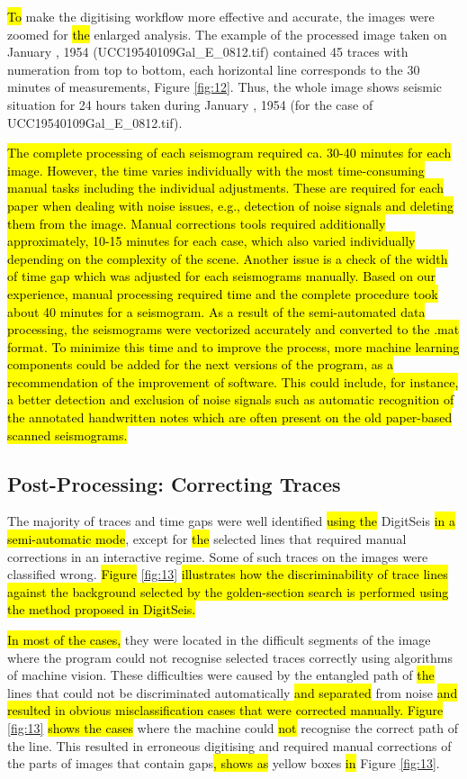 \documentclass[sensors,article,submit,moreauthors,pdftex]{Definitions/mdpi}
\begin{document}
\hl{To }make the digitising workflow more effective and accurate, the images were zoomed for \hl{the }enlarged analysis. The example of the processed image taken on January , 1954 (UCC19540109Gal\_E\_0812.tif) contained 45 traces with numeration from top to bottom, each horizontal line corresponds to the 30 minutes of measurements, Figure \ref{fig:12}. Thus, the whole image shows seismic situation for 24 hours taken during January , 1954 (for the case of UCC19540109Gal\_E\_0812.tif).

\hl{The complete processing of each seismogram required ca. 30-40 minutes for each image. However, the time varies individually with the most time-consuming manual tasks including the individual adjustments. These are required for each paper when dealing with noise issues, e.g., detection of noise signals and deleting them from the image. Manual corrections tools required additionally approximately, 10-15 minutes for each case, which also varied individually depending on the complexity of the scene. Another issue is a check of the width of time gap which was adjusted for each seismograms manually. Based on our experience, manual processing required time and the complete procedure took about 40 minutes for a seismogram. As a result of the semi-automated data processing, the seismograms were vectorized accurately and converted to the .mat format. To minimize this time and to improve the process, more machine learning components could be added for the next versions of the program, as a recommendation of the improvement of software. This could include, for instance, a better detection and exclusion of noise signals such as automatic recognition of the annotated handwritten notes which are often present on the old paper-based scanned seismograms.}

\subsection{Post-Processing: Correcting Traces}

The majority of traces and time gaps were well identified \hl{using the }DigitSeis \hl{in a semi-automatic mode}, except for \hl{the }selected lines that required manual corrections in an interactive regime. Some of such traces on the images were classified wrong.\hl{ Figure} \ref{fig:13} \hl{illustrates how the discriminability of trace lines against the background selected by the golden-section search is performed using the method proposed in DigitSeis.}

\hl{In most of the cases,} they were located in the difficult segments of the image where the program could not recognise selected traces correctly using algorithms of machine vision. These difficulties were caused by the entangled path of\hl{ the }lines that could not be discriminated automatically \hl{and separated }from noise \hl{and resulted in obvious misclassification cases that were corrected manually. Figure } \ref{fig:13} \hl{shows the cases }where the machine could \hl{not }recognise the correct path of the line. This resulted in erroneous digitising and required manual corrections of the parts of images that contain gaps\hl{, shows as }yellow boxes\hl{ in }Figure \ref{fig:13}. 
\end{document}
